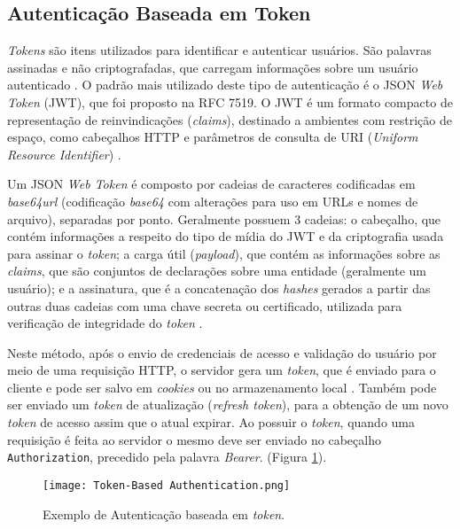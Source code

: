\subsection{Autenticação Baseada em Token}

\emph{Tokens} são itens utilizados para identificar e autenticar usuários. São palavras assinadas e 
não criptografadas, que carregam informações sobre um usuário autenticado \cite{BALAJ2017}. O 
padrão mais utilizado deste tipo de autenticação é o JSON \emph{Web Token} (JWT), que foi proposto
na RFC 7519. O JWT é um formato compacto de representação de reinvindicações (\emph{claims}), 
destinado a ambientes com restrição de espaço, como cabeçalhos HTTP e parâmetros de consulta de URI 
(\emph{Uniform Resource Identifier}) \cite{RFC7519}.

Um JSON \emph{Web Token} é composto por cadeias de caracteres codificadas em \emph{base64url} (codificação
\emph{base64} com alterações para uso em URLs e nomes de arquivo), separadas 
por ponto. Geralmente possuem 3 cadeias: o cabeçalho, que contém informações a respeito do tipo de mídia do 
JWT e da criptografia usada para assinar o \emph{token}; a carga útil (\emph{payload}), que contém 
as informações sobre as \emph{claims}, que são conjuntos de declarações sobre uma entidade 
(geralmente um usuário); e a assinatura, que é a concatenação dos \emph{hashes} gerados a partir das 
outras duas cadeias com uma chave secreta ou certificado, utilizada para verificação de integridade
do \emph{token} \cite{MONTANHEIRO2017}.

Neste método, após o envio de credenciais de acesso e validação do usuário por meio de uma 
requisição HTTP, o servidor gera um \emph{token}, que é enviado para o cliente e pode ser salvo
em \emph{cookies} ou no armazenamento local \cite{MONTANHEIRO2017}. Também pode ser enviado um 
\emph{token} de atualização (\emph{refresh token}), para a obtenção de um novo \emph{token} de acesso
assim que o atual expirar. Ao possuir o \emph{token}, quando uma requisição é feita ao servidor o 
mesmo deve ser enviado no cabeçalho \texttt{Authorization}, precedido pela palavra \emph{Bearer}. 
\cite{RFC6749} (Figura \ref{fig:tokenAuth}).

\begin{figure}[ht]
  \centering
  \texttt{[image: Token-Based Authentication.png]}
  \caption{Exemplo de Autenticação baseada em \emph{token}.}
  \label{fig:tokenAuth}
\end{figure}

\

\